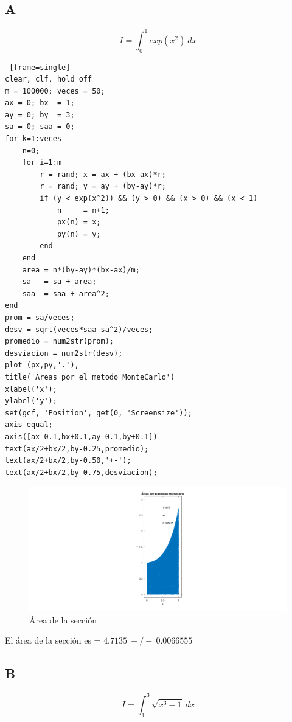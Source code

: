 \documentclass{article}
\begin{document}
\subsection{A}

\begin{equation}
I = \int_{0}^{1} exp(x^2)~dx
\end{equation}

\begin{lstlisting} [frame=single]
clear, clf, hold off
m = 100000; veces = 50;
ax = 0; bx  = 1;
ay = 0; by  = 3;
sa = 0; saa = 0;
for k=1:veces
    n=0;
    for i=1:m
        r = rand; x = ax + (bx-ax)*r;
        r = rand; y = ay + (by-ay)*r;
        if (y < exp(x^2)) && (y > 0) && (x > 0) && (x < 1)
            n     = n+1;
            px(n) = x; 
            py(n) = y;
        end
    end
    area = n*(by-ay)*(bx-ax)/m;
    sa   = sa + area;
    saa  = saa + area^2;
end
prom = sa/veces;
desv = sqrt(veces*saa-sa^2)/veces;
promedio = num2str(prom);
desviacion = num2str(desv);
plot (px,py,'.'),
title('Áreas por el metodo MonteCarlo') 
xlabel('x');
ylabel('y');
set(gcf, 'Position', get(0, 'Screensize'));
axis equal;
axis([ax-0.1,bx+0.1,ay-0.1,by+0.1])
text(ax/2+bx/2,by-0.25,promedio);
text(ax/2+bx/2,by-0.50,'+-');
text(ax/2+bx/2,by-0.75,desviacion);
\end{lstlisting}

\begin{figure}[H]
\centering
    \includegraphics[width=1\textwidth]{images/FIG02A.png}
    \caption{Área de la sección}
\end{figure}
El área de la sección es = $4.7135~+/-~0.0066555$

\subsection{B}

\begin{equation}
I = \int_{1}^{3} \sqrt{x^3-1}~dx
\end{equation}
\end{document}
